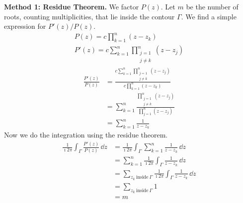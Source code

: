 {%
\begin{Solution}
  \label{solution P'(z)/P(z)}
  \textbf{Method 1: Residue Theorem.}
  We factor $P(z)$.  Let $m$ be the number of roots, counting multiplicities,
  that lie inside the contour $\Gamma$.  We find a simple expression for 
  $P'(z) / P(z)$.
  \begin{gather*}
    P(z) = c \prod_{k = 1}^n (z - z_k) \\
    P'(z) = c \sum_{k = 1}^n \prod_{\substack{j = 1\\j \neq k}}^n (z - z_j) 
  \end{gather*}
  \begin{align*}
    \frac{P'(z)}{P(z)}
    &= \frac{ c \sum_{k = 1}^n 
      \prod_{\substack{j = 1\\j \neq k}}^n (z - z_j) }
    { c \prod_{k = 1}^n (z - z_k) } \\
    &= \sum_{k = 1}^n 
    \frac{ \prod_{\substack{j = 1\\j \neq k}}^n (z - z_j) }
    { \prod_{j = 1}^n (z - z_j) } \\
    &= \sum_{k = 1}^n \frac{1}{z - z_k}
  \end{align*}
  Now we do the integration using the residue theorem.
  \begin{align*}
    \frac{1}{\imath 2 \pi} \int_\Gamma \frac{P'(z)}{P(z)} \,\dd z
    &= \frac{1}{\imath 2 \pi} \int_\Gamma 
    \sum_{k = 1}^n \frac{1}{z - z_k} \,\dd z \\
    &= \sum_{k = 1}^n \frac{1}{\imath 2 \pi} \int_\Gamma 
    \frac{1}{z - z_k} \,\dd z \\
    &= \sum_{z_k\ \mathrm{inside}\  \Gamma} \frac{1}{\imath 2 \pi} \int_\Gamma 
    \frac{1}{z - z_k} \,\dd z \\
    &= \sum_{z_k\ \mathrm{inside}\ \Gamma} 1 \\
    &= m
  \end{align*}



\end{Solution}}
